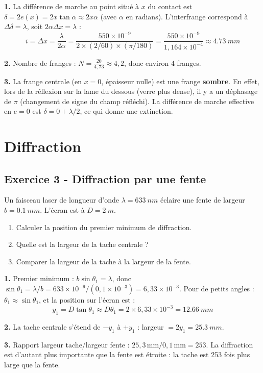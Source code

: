 \documentclass[12pt,a4paper]{article}
\begin{document}
\begin{boitecorrige}
\textbf{1.} La différence de marche au point situé à $x$ du contact est $\delta = 2e(x) = 2x\tan\alpha \approx 2x\alpha$ (avec $\alpha$ en radians). L'interfrange correspond à $\Delta\delta = \lambda$, soit $2\alpha\Delta x = \lambda$ :
\[
i = \Delta x = \frac{\lambda}{2\alpha} = \frac{550\times10^{-9}}{2\times(2/60)\times(\pi/180)} = \frac{550\times10^{-9}}{1{,}164\times10^{-4}} \approx \qty{4.73}{mm}
\]

\textbf{2.} Nombre de franges : $N = \frac{20}{4{,}73} \approx 4{,}2$, donc environ 4 franges.

\textbf{3.} La frange centrale (en $x=0$, épaisseur nulle) est une frange \textbf{sombre}. En effet, lors de la réflexion sur la lame du dessous (verre plus dense), il y a un déphasage de $\pi$ (changement de signe du champ réfléchi). La différence de marche effective en $e=0$ est $\delta = 0+\lambda/2$, ce qui donne une extinction.
\end{boitecorrige}

\section{Diffraction}

\subsection*{Exercice 3 - Diffraction par une fente \niveau{\moyen}}

\begin{boiteexercice}
Un faisceau laser de longueur d'onde $\lambda = \qty{633}{nm}$ éclaire une fente de largeur $b = \qty{0.1}{mm}$. L'écran est à $D = \qty{2}{m}$.
\begin{enumerate}
  \item Calculer la position du premier minimum de diffraction.
  \item Quelle est la largeur de la tache centrale ?
  \item Comparer la largeur de la tache à la largeur de la fente.
\end{enumerate}
\end{boiteexercice}

\begin{boitecorrige}
\textbf{1.} Premier minimum : $b\sin\theta_1 = \lambda$, donc $\sin\theta_1 = \lambda/b = 633\times10^{-9}/(0{,}1\times10^{-3}) = 6{,}33\times10^{-3}$. Pour de petits angles : $\theta_1\approx\sin\theta_1$, et la position sur l'écran est :
\[
y_1 = D\tan\theta_1 \approx D\theta_1 = 2\times6{,}33\times10^{-3} = \qty{12.66}{mm}
\]

\textbf{2.} La tache centrale s'étend de $-y_1$ à $+y_1$ : largeur $= 2y_1 = \qty{25.3}{mm}$.

\textbf{3.} Rapport largeur tache/largeur fente : $25{,}3\,\text{mm}/0{,}1\,\text{mm} = 253$. La diffraction est d'autant plus importante que la fente est étroite : la tache est 253 fois plus large que la fente.
\end{boitecorrige}
\end{document}
